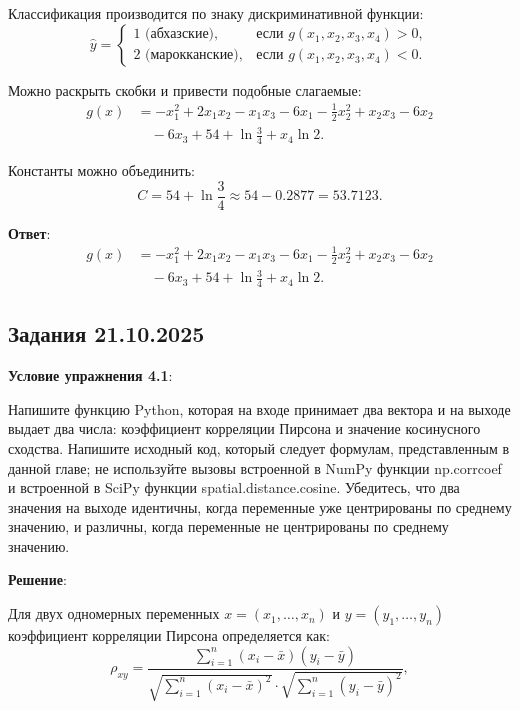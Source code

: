 \documentclass[pract]{SCWorks}
\begin{document}
    Классификация производится по знаку дискриминативной функции:
    \[
    \boxed{
    \hat{y} =
    \begin{cases}
    1 \text{ (абхазские)}, & \text{если } g(x_1, x_2, x_3, x_4) > 0, \\
    2 \text{ (марокканские)}, & \text{если } g(x_1, x_2, x_3, x_4) < 0.
    \end{cases}
    }
    \]

    Можно раскрыть скобки и привести подобные слагаемые:
    \[
    \begin{aligned}
    g(x) &= -x_1^2 + 2x_1x_2 - x_1x_3 - 6x_1 - \frac{1}{2}x_2^2 + x_2x_3 - 6x_2 \\
    &\quad - 6x_3 + 54 + \ln\frac{3}{4} + x_4 \ln 2.
    \end{aligned}
    \]

    Константы можно объединить:
    \[
    C = 54 + \ln\frac{3}{4} \approx 54 - 0.2877 = 53.7123.
    \]

    \textbf{Ответ}:
    \[
    \begin{aligned}
    g(x) &= -x_1^2 + 2x_1x_2 - x_1x_3 - 6x_1 - \frac{1}{2}x_2^2 + x_2x_3 - 6x_2 \\
    &\quad - 6x_3 + 54 + \ln\frac{3}{4} + x_4 \ln 2.
    \end{aligned}
    \]

    \subsection{Задания 21.10.2025}

    \textbf{Условие упражнения 4.1}:

    Напишите функцию Python, которая на входе принимает два вектора и на выходе выдает два числа: коэффициент корреляции Пирсона и значение косинусного сходства.
    Напишите исходный код, который следует формулам, представленным в данной главе; не используйте вызовы встроенной в NumPy функции np.corrcoef и встроенной в SciPy функции spatial.distance.cosine.
    Убедитесь, что два значения на выходе идентичны, когда переменные уже центрированы по среднему значению, и различны, когда переменные не центрированы по среднему значению.

    \textbf{Решение}:

    Для двух одномерных переменных $x = (x_1, \dots, x_n)$ и $y = (y_1, \dots, y_n)$ коэффициент корреляции Пирсона определяется как:
    \[
    \rho_{xy} = \frac{\sum_{i=1}^{n} (x_i - \bar{x})(y_i - \bar{y})}
    {\sqrt{\sum_{i=1}^{n} (x_i - \bar{x})^2} \cdot \sqrt{\sum_{i=1}^{n} (y_i - \bar{y})^2}},
    \]
\end{document}
